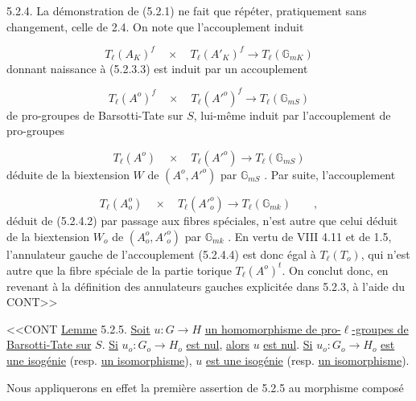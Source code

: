 5.2.4.  La démonstration de (5.2.1) ne fait que répéter, pratiquement sans changement, celle de 2.4. On note que l'accouplement induit

\begin{equation}\tag{5.2.4.1}
T_\ell(A_K)^f \quad \times \quad T_\ell(A'_K)^f \longrightarrow T_\ell(\mathbb{G}_{mK})
\end{equation}
donnant naissance à (5.2.3.3) est induit par un accouplement

\begin{equation}\tag{5.2.4.2}
T_\ell(A^o)^f \quad \times \quad T_\ell({A'}^o)^f \longrightarrow T_\ell(\mathbb{G}_{mS})
\end{equation}
de pro-groupes de Barsotti-Tate sur $S$, lui-même induit par l'accouplement de pro-groupes

\begin{equation}\tag{5.2.4.3}
T_\ell(A^o) \quad \times \quad T_\ell({A'}^o) \longrightarrow T_\ell(\mathbb{G}_{mS})
\end{equation}
déduite de la biextension $W$ de $(A^o,{A'}^o)$ par $\mathbb{G}_{mS}$ . Par suite, l'accouplement

\begin{equation}\tag{5.2.4.4}
T_\ell(A_o^{o}) \quad \times \quad T_\ell({A'}_o^{o}) \longrightarrow T_\ell(\mathbb{G}_{mk}) \qquad ,
\end{equation}
déduit de (5.2.4.2) par passage aux fibres spéciales, n'est autre que celui déduit de la biextension $W_o$ de $(A_o^{o},{A'}_o^{o})$ par $\mathbb{G}_{mk}$ . En vertu de VIII 4.11 et de 1.5, l'annulateur gauche de l'accouplement (5.2.4.4) est donc égal à $T_\ell(T_o)$, qui n'est autre que la fibre spéciale de la partie torique $T_\ell(A^o)^t$. On conclut donc, en revenant à la définition des annulateurs gauches explicitée dans 5.2.3, à l'aide du CONT>>



<<CONT \underline{Lemme} 5.2.5. \underline{Soit} $u : G \longrightarrow H$ \underline{un homomorphisme de pro-$\ell$-groupes de Barsotti-Tate sur} $S$. \underline{Si} $u_o : G_o \longrightarrow H_o$ \underline{est nul}, \underline{alors} $u$ \underline{est nul}. \underline{Si} $u_o : G_o \longrightarrow H_o$ \underline{est une isogénie} (resp. \underline{un isomorphisme}), $u$ \underline{est une isogénie} (resp. \underline{un isomorphisme}).

Nous appliquerons en effet la première assertion de 5.2.5 au morphisme composé

